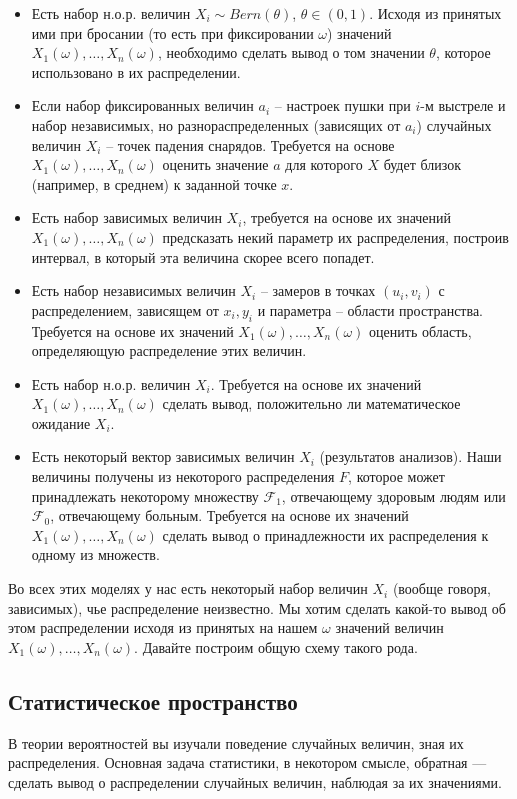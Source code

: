 \documentclass[10 pt,russian]{article}
\begin{document}
\begin{itemize}
\item Есть набор н.о.р. величин $X_i\sim Bern(\theta)$, $\theta\in (0,1)$. Исходя из принятых ими при бросании (то есть при фиксировании $\omega$) значений $X_1(\omega),\dotsc, X_n(\omega)$, необходимо сделать вывод о том значении $\theta$, которое использовано в их распределении.
\item Если набор фиксированных величин $a_i$ -- настроек пушки при $i$-м выстреле и набор независимых, но разнораспределенных (зависящих от $a_i$) случайных величин $X_i$ -- точек падения снарядов. Требуется на основе  $X_1(\omega),\dotsc, X_n(\omega)$ оценить значение $a$ для которого $X$ будет близок (например, в среднем) к заданной точке $x$.  
\item Есть набор зависимых величин $X_i$, требуется на основе их значений $X_1(\omega),\dotsc, X_n(\omega)$ предсказать некий параметр их распределения, построив интервал, в который эта величина скорее всего попадет.
\item Есть набор независимых величин $X_i$ -- замеров в точках $(u_i,v_i)$ с распределением, зависящем от $x_i,y_i$ и параметра -- области пространства. Требуется на основе их значений $X_1(\omega),\dotsc, X_n(\omega)$ оценить область, определяющую распределение этих величин. 
\item Есть набор н.о.р. величин $X_i$. Требуется на основе их значений $X_1(\omega),\dotsc, X_n(\omega)$ сделать вывод, положительно ли математическое ожидание $X_i$.
\item Есть некоторый вектор зависимых величин $X_i$ (результатов анализов). Наши величины получены из некоторого распределения $F$, которое может принадлежать некоторому множеству $\mathcal{F}_1$, отвечающему здоровым людям или $\mathcal{F}_0$, отвечающему больным. Требуется на основе их значений $X_1(\omega),\dotsc, X_n(\omega)$ сделать вывод о принадлежности их распределения к одному из множеств.
 \end{itemize}
 Во всех этих моделях у нас есть некоторый набор величин $X_i$ (вообще говоря, зависимых), чье распределение неизвестно. Мы хотим сделать какой-то вывод об этом распределении исходя из принятых на нашем $\omega$ значений величин $X_1(\omega),\dotsc, X_n(\omega)$.  Давайте построим общую схему такого рода.
\subsection{Статистическое пространство}
В теории вероятностей вы изучали поведение случайных величин, зная их распределения. Основная задача статистики, в некотором смысле, обратная --- сделать вывод о распределении случайных величин, наблюдая за их значениями.
\end{document}
